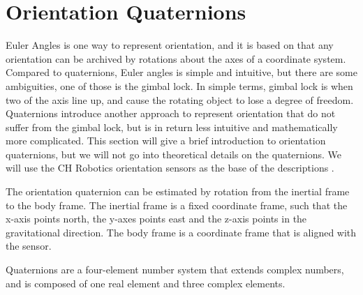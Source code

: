 \section{Orientation Quaternions}
\label{sec:quaternion}
Euler Angles is one way to represent orientation, and it is based on that any orientation can be archived by rotations about the axes of a coordinate system. Compared to quaternions, Euler angles is simple and intuitive, but there are some ambiguities, one of those is the gimbal lock. In simple terms, gimbal lock is when two of the axis line up, and cause the rotating object to lose a degree of freedom. Quaternions introduce another approach to represent orientation that do not suffer from the gimbal lock, but is in return less intuitive and mathematically more complicated. This section will give a brief introduction to orientation quaternions, but we will not go into theoretical details on the quaternions. We will use the CH Robotics orientation sensors as the base of the descriptions \cite{CH_Robotics}.

The orientation quaternion can be estimated by rotation from the inertial frame to the body frame. The inertial frame is a fixed coordinate frame, such that the x-axis points north, the y-axes points east and the z-axis points in the gravitational direction. The body frame is a coordinate frame that is aligned with the sensor.

Quaternions are a four-element number system that extends complex numbers, and is composed of one real element and three complex elements. 